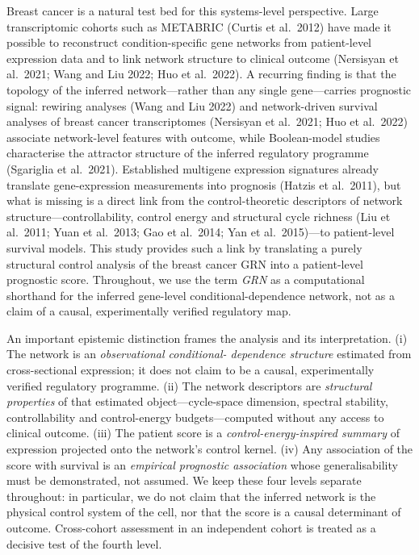 \documentclass[12pt]{article}
\begin{document}
Breast cancer is a natural test bed for this systems-level perspective.
Large transcriptomic cohorts such as METABRIC (Curtis et al.\ 2012) have
made it possible to reconstruct condition-specific gene networks from
patient-level expression data and to link network structure to clinical
outcome (Nersisyan et al.\ 2021; Wang and Liu 2022; Huo et al.\ 2022). A
recurring finding is that the topology of the inferred network---rather than
any single gene---carries prognostic signal: rewiring analyses (Wang and Liu
2022) and network-driven survival analyses of breast cancer transcriptomes
(Nersisyan et al.\ 2021; Huo et al.\ 2022) associate network-level features
with outcome, while Boolean-model studies characterise the attractor
structure of the inferred regulatory programme (Sgariglia et al.\ 2021). Established multigene expression signatures already translate
gene-expression measurements into prognosis (Hatzis et al.\ 2011), but what
is missing is a direct link from the control-theoretic descriptors of network
structure---controllability,
control energy and structural cycle richness (Liu et al.\ 2011; Yuan et
al.\ 2013; Gao et al.\ 2014; Yan et al.\ 2015)---to patient-level survival
models. This
study provides such a link by translating a purely structural control
analysis of the breast cancer GRN into a patient-level prognostic score.
Throughout, we use the term \emph{GRN} as a computational shorthand for the
inferred gene-level conditional-dependence network, not as a claim of a
causal, experimentally verified regulatory map.

An important epistemic distinction frames the analysis and its
interpretation. (i) The network is an \emph{observational conditional-
dependence structure} estimated from cross-sectional expression; it does
not claim to be a causal, experimentally verified regulatory programme.
(ii) The network descriptors are \emph{structural properties} of that
estimated object---cycle-space dimension, spectral stability,
controllability and control-energy budgets---computed without any access to
clinical outcome.
(iii) The patient score is a \emph{control-energy-inspired summary} of
expression projected onto the network's control kernel. (iv) Any
association of the score with survival is an \emph{empirical prognostic
association} whose generalisability must be demonstrated, not assumed.
We keep these four levels separate throughout: in particular, we do not
claim that the inferred network is the physical control system of the cell,
nor that the score is a causal determinant of outcome. Cross-cohort assessment
in an independent cohort is treated as a decisive test of the fourth level.
\end{document}
